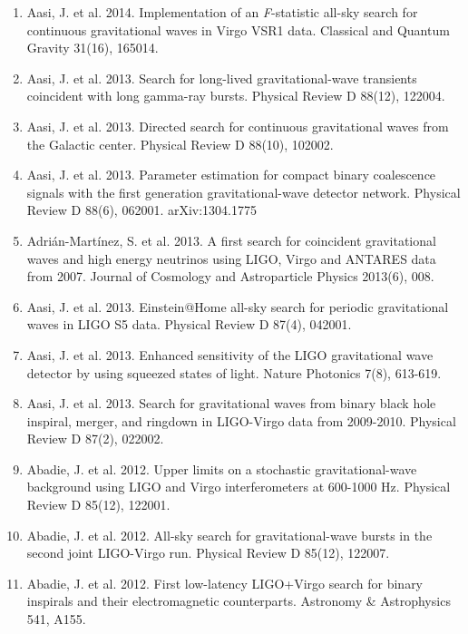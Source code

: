 \documentclass[margin,line]{res}
\begin{document}
\begin{resume}
\begin{enumerate}
\item Aasi, J. et al. 2014. Implementation of an {\it F}-statistic all-sky search for continuous gravitational waves in Virgo VSR1 data. Classical and Quantum Gravity 31(16), 165014.

\item Aasi, J. et al. 2013. Search for long-lived gravitational-wave transients coincident with long gamma-ray bursts. Physical Review D 88(12), 122004. 

\item Aasi, J. et al. 2013. Directed search for continuous gravitational waves from the Galactic center. Physical Review D 88(10), 102002. 

\item Aasi, J. et al. 2013. Parameter estimation for compact binary coalescence signals with the first generation gravitational-wave detector network. Physical Review D 88(6), 062001.  arXiv:1304.1775

\item Adri\'{a}n-Mart\'{i}nez, S. et al. 2013. A first search for coincident gravitational waves and high energy neutrinos using LIGO, Virgo and ANTARES data from 2007. Journal of Cosmology and Astroparticle Physics 2013(6), 008. 

\item Aasi, J. et al. 2013. Einstein@Home all-sky search for periodic gravitational waves in LIGO S5 data. Physical Review D  87(4), 042001. 

\item Aasi, J. et al. 2013. Enhanced sensitivity of the LIGO gravitational wave detector by using squeezed states of light. Nature Photonics 7(8),  613-619.

\item Aasi, J. et al. 2013. Search for gravitational waves from binary black hole inspiral, merger, and ringdown in LIGO-Virgo data from 2009-2010. Physical Review D  87(2), 022002. 

\item Abadie, J. et al. 2012. Upper limits on a stochastic gravitational-wave background using LIGO and Virgo interferometers at 600-1000 Hz. Physical Review D  85(12), 122001. 

\item Abadie, J. et al. 2012. All-sky search for gravitational-wave bursts in the second joint LIGO-Virgo run. Physical Review D 85(12), 122007. 

\item Abadie, J. et al. 2012. First low-latency LIGO+Virgo search for binary inspirals and their electromagnetic counterparts. Astronomy \& Astrophysics 541, A155. 


\end{enumerate}
\end{resume}
\end{document}
